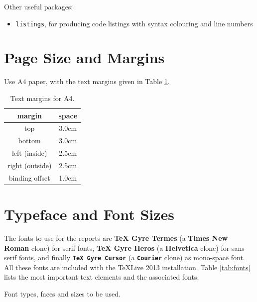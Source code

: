 \documentclass[nofilelist]{cslthse-msc}
\begin{document}
\begin{appendices}
\noindent Other useful packages:
\begin{itemize}
\item \texttt{listings}, for producing code listings with syntax colouring and line numbers
\end{itemize}

\section{Page Size and Margins}
Use A4 paper, with the text margins given in Table \ref{tab:margins}.
\begin{table}[!hbt]
\centering
\caption{Text margins for A4.}\label{tab:margins}
\begin{tabular}{cc}
\hline
\textbf{margin} & \textbf{space} \\
\hline 
top &  3.0cm\\ 

bottom & 3.0cm \\ 
 
left (inside) & 2.5cm \\ 

right (outside) & 2.5cm \\ 

binding offset & 1.0cm \\ 
\hline 
\end{tabular} 
\end{table}

\section{Typeface and Font Sizes}
The fonts to use for the reports are \textbf{TeX Gyre Termes} (a \textbf{Times New Roman} clone) for serif fonts, \textsf{\textbf{TeX Gyre Heros}} (a \textsf{\textbf{Helvetica}} clone) for sans-serif fonts, and finally \texttt{\textbf{TeX Gyre Cursor}} (a \texttt{\textbf{Courier}} clone) as mono-space font. All these fonts are included with the TeXLive 2013 installation. Table \ref{tab:fonts} lists the most important text elements and the associated fonts.
\begin{table}[!hbt]
\caption{Font types, faces and sizes to be used.}\label{tab:fonts}


\end{table}
\end{appendices}
\end{document}
